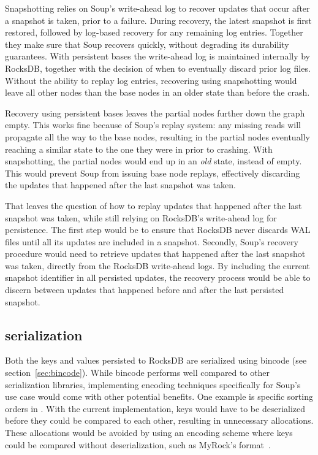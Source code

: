 Snapshotting relies on Soup's write-ahead log to recover updates that occur
after a snapshot is taken, prior to a failure. During recovery, the latest
snapshot is first restored, followed by log-based recovery for any remaining log
entries. Together they make sure that Soup recovers quickly, without degrading
its durability guarantees. With persistent bases the write-ahead log is
maintained internally by RocksDB, together with the decision of when to
eventually discard prior log files. Without the ability to replay log entries,
recovering using snapshotting would leave all other nodes than the base nodes in
an older state than before the crash.

Recovery using persistent bases leaves the partial nodes further down the graph
empty. This works fine because of Soup's replay system: any missing reads will
propagate all the way to the base nodes, resulting in the partial nodes
eventually reaching a similar state to the one they were in prior to crashing.
With snapshotting, the partial nodes would end up in an \textit{old} state,
instead of empty. This would prevent Soup from issuing base node replays,
effectively discarding the updates that happened after the last snapshot was
taken.

That leaves the question of how to replay updates that happened after the last
snapshot was taken, while still relying on RocksDB's write-ahead log for
persistence. The first step would be to ensure that RocksDB never discards WAL
files until all its updates are included in a snapshot. Secondly, Soup's
recovery procedure would need to retrieve updates that happened after the last
snapshot was taken, directly from the RocksDB write-ahead logs. By including the
current snapshot identifier in all persisted updates, the recovery process would
be able to discern between updates that happened before and after the last
persisted snapshot.

\subsection{ serialization}

Both the keys and values persisted to RocksDB are serialized using bincode (see
section~\ref{sec:bincode}). While bincode performs well compared to other
serialization libraries, implementing encoding techniques specifically for
Soup's use case would come with other potential benefits. One example is
specific sorting orders in . With the current
implementation, keys would have to be deserialized before they could be compared
to each other, resulting in unnecessary allocations. These allocations would be
avoided by using an encoding scheme where keys could be compared without
deserialization, such as \eg MyRock's 
format~\cite{myrocks-encoding}.

